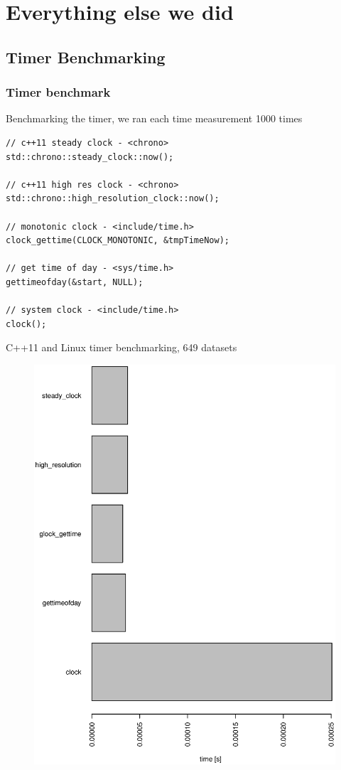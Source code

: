 \section{Everything else we did}

\subsection{Timer Benchmarking}
\begin{frame}[fragile]
\frametitle{Timer benchmark}
Benchmarking the timer, we ran each time measurement 1000 times

\begin{lstlisting}
// c++11 steady clock - <chrono>
std::chrono::steady_clock::now();

// c++11 high res clock - <chrono>
std::chrono::high_resolution_clock::now();

// monotonic clock - <include/time.h>
clock_gettime(CLOCK_MONOTONIC, &tmpTimeNow);

// get time of day - <sys/time.h>
gettimeofday(&start, NULL);

// system clock - <include/time.h>
clock();
\end{lstlisting}
\end{frame}

\begin{frame}
C++11 and Linux timer benchmarking, 649 datasets
\begin{figure}[H]
  \centering 
  \includegraphics[height=0.90\textheight]{pictures/timer_benchmarks.eps}
\end{figure}
\end{frame}

